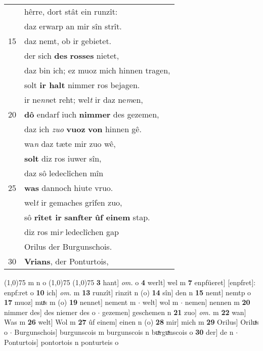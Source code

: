 \documentclass[8pt,a4paper,notitlepage]{article}
\begin{document}
\begin{table}[ht]
\begin{minipage}[t]{0.5\linewidth}
\begin{tabular}{rl}
 & hêrre, dort stât ein runzît:\\ 
 & daz erwarp an mir sîn strît.\\ 
15 & daz nemt, ob ir gebietet.\\ 
 & der sich \textbf{des} \textbf{rosses} nietet,\\ 
 & daz bin ich; ez muoz mich hinnen tragen,\\ 
 & solt \textbf{ir halt} nimmer ros bejagen.\\ 
 & ir ne\textit{nn}et reht; wel\textit{t} ir daz ne\textit{m}en,\\ 
20 & \textbf{dô} endarf iuch \textbf{nimmer} des gezemen,\\ 
 & daz ich \textit{zuo} \textbf{vuoz} \textbf{von} hinnen gê.\\ 
 & wa\textit{n} daz tæte mir zuo wê,\\ 
 & \textbf{solt} diz ros iuwer sîn,\\ 
 & daz sô ledeclîchen mîn\\ 
25 & \textbf{was} dannoch hiute vruo.\\ 
 & wel\textit{t} ir gemaches grîfen zuo,\\ 
 & sô \textbf{rîtet ir} \textbf{sanfter} \textbf{ûf einem} stap.\\ 
 & diz ros mi\textit{r} ledeclîchen gap\\ 
 & Orilus der Burgunschois.\\ 
30 & \textbf{Vrians}, der Ponturtois,\\ 
\end{tabular}
\scriptsize
\line(1,0){75} \newline
m n o \newline
\line(1,0){75} \newline
\newline
\line(1,0){75} \newline
\textbf{3} hant] \textit{om.} o \textbf{4} werlt] wel m \textbf{7} enpfüeret] [enpfret]: enpf:ret o \textbf{10} ich] \textit{om.} m \textbf{13} runzît] rinzit n (o) \textbf{14} sîn] den n \textbf{15} nemt] nemtp o \textbf{17} muoz] muͯs m (o) \textbf{19} nennet] nement m  $\cdot$ welt] wol m  $\cdot$ nemen] nennen m \textbf{20} nimmer des] des niemer des o  $\cdot$ gezemen] geschemen n \textbf{21} zuo] \textit{om.} m \textbf{22} wan] Was m \textbf{26} welt] Wol m \textbf{27} ûf einem] einen n (o) \textbf{28} mir] mich m \textbf{29} Orilus] Oriluͯs o  $\cdot$ Burgunschois] burgunscois m burgunscois n buͯrguͯnscois o \textbf{30} der] de n  $\cdot$ Ponturtois] pontortois n ponturteis o \newline
\end{minipage}
\end{table}
\end{document}
